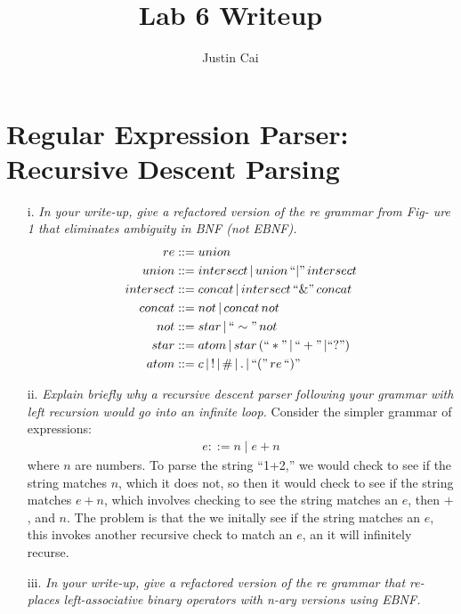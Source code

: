 \documentclass[11pt, letter]{article}
\title{Lab 6 Writeup}
\author{Justin Cai}
\begin{document}
    \maketitle

    \section{Regular Expression Parser: Recursive Descent Parsing}
    \begin{itemize}
        \item [i.] \textit{In your write-up, give a refactored version of the re grammar from Fig-
        ure 1 that eliminates ambiguity in BNF (not EBNF).}
        \begin{align*}
            re &::= union\\
            union &::= intersect \, | \, union \, ``|" \, intersect \\
            intersect &::= concat \, | \, intersect \, ``\&" \, concat \\
            concat &::= not \, | \, concat \, not \\
            not &::= star \, | \, ``\sim" \, not \\
            star &::= atom \, | \, star \, (``*" \, | \, ``+" \, | ``?") \\
            atom &::= c \, | \, ! \, | \, \# \, | \, . \, | \, ``(" \, re \, ``)"
        \end{align*}
        \item [ii.] \textit{Explain briefly why a recursive descent parser following your grammar
        with left recursion would go into an infinite loop.}
        Consider the simpler grammar of expressions:
        \begin{align*}
            e ::= n \mid e + n
        \end{align*}
        where $n$ are numbers. To parse the string ``1+2,'' we would check to see if the string
        matches $n$, which it does not, so then it would check to see if the string matches $e+n$, 
        which involves checking to see the string matches an $e$, then $+$, and $n$. The problem is 
        that the we initally see if the string matches an $e$, this invokes another recursive check to 
        match an $e$, an it will infinitely recurse.
        \item [iii.] \textit{In your write-up, give a refactored version of the re grammar that re-
        places left-associative binary operators with n-ary versions using EBNF.}
        \begin{align*}

\end{align*}
\end{itemize}
\end{document}
